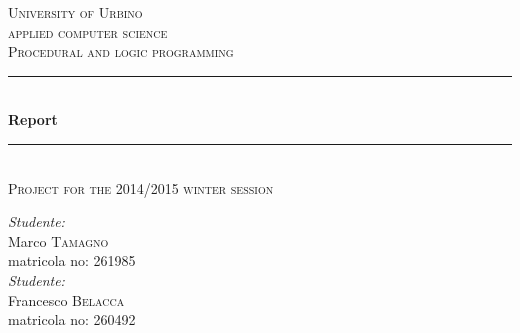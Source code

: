 \documentclass[11pt, a4paper, titlepage, block]{article}
\begin{document}
	\begin{titlepage}
		
		\newcommand{\HRule}{\rule{\linewidth}{0.5mm}} %
		
		\center %
		
		
		\textsc{\LARGE University of Urbino}\\[1.5cm] %
		\textsc{\Large applied computer science}\\[0.5cm] %
		\textsc{\large Procedural and logic programming}\\[0.5cm] %
		
		
		
		\HRule \\[0.4cm]
		{ \huge \bfseries Report}\\[0.2cm] %
		\HRule \\[0.4cm]
		\textsc{\large Project for the 2014/2015 winter session}
		\\[2cm]
		
		\begin{minipage}{\textwidth}
			\begin{flushleft}
				\emph{Studente:}\\
				Marco \textsc{Tamagno}\\ %
				matricola no: 261985
				\\[1cm]
				\emph{Studente:}\\
				Francesco \textsc{Belacca}\\ %
				matricola no: 260492\\
			\end{flushleft}
		\end{minipage}\\[1cm]
		

\end{titlepage}
\end{document}
